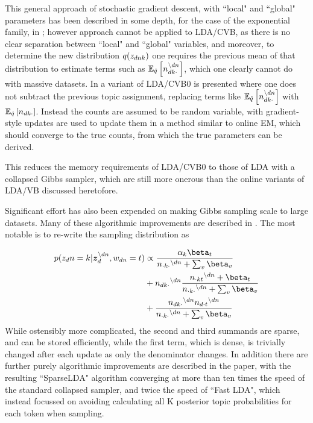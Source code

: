 This general approach of stochastic gradient descent, with ``local" and ``global" parameters has been described in some depth, for the case of the exponential family, in \cite{Hoffman2012}; however approach cannot be applied to LDA/CVB, as there is no clear separation between ``local" and ``global" variables, and moreover, to determine the new distribution $q(\zdnk)$ one requires the previous mean of that distribution to estimate terms such as $\ex{n_{dk\cdot}^{\setminus dn}}{\hat{q}}$, which one clearly cannot do with massive datasets. In \cite{Boyles2013} a variant of LDA/CVB0 is presented where one does not subtract the previous topic assignment, replacing terms like $\ex{n_{dk\cdot}^{\setminus dn}}{\hat{q}}$ with $\ex{n_{dk\cdot}}{\hat{q}}$. Instead the counts are assumed to be random variable, with gradient-style updates are used to update them in a method similar to online EM\cite{Cappe2009}, which should converge to the true counts, from which the true parameters can be derived. 

This reduces the memory requirements of LDA/CVB0 to those of LDA with a collapsed Gibbs sampler, which are still more onerous than the online variants of LDA/VB discussed heretofore. 


Significant effort has also been expended on making Gibbs sampling scale to large datasets. Many of these algorithmic improvements are described in \cite{Yao2009}. The most notable is to re-write the sampling distribution as

\newcommand \nodn { { ^{\setminus dn } } }

\begin{align}
\begin{split}
p(z_dn = k | \vv{z}_{d}^{\setminus dn}, w_{dn}=t) & \propto \frac{\alpha_k \beta_t}{n_{\cdot k \cdot}\nodn + \sum_v \beta_v} \\
& + n_{dk\cdot}\nodn \frac{n_{\cdot kt}\nodn + \beta_t}{n_{\cdot k \cdot}\nodn + \sum_v \beta_v} \\
& + \frac{n_{dk\cdot}\nodn n_{d\cdot t}\nodn}{n_{\cdot k \cdot}\nodn + \sum_v \beta_v}
\end{split}
\end{align}
While ostensibly more complicated, the second and third summands are sparse, and can be stored efficiently, while the first term, which is dense, is trivially changed after each update as only the denominator changes. In addition there are further purely algorithmic improvements are described in the paper, with the resulting ``SparseLDA" algorithm converging at more than ten times the speed of the standard collapsed sampler, and twice the speed of ``Fast LDA"\cite{Porteous2008}, which instead focussed on avoiding calculating all K posterior topic probabilities for each token when sampling.

